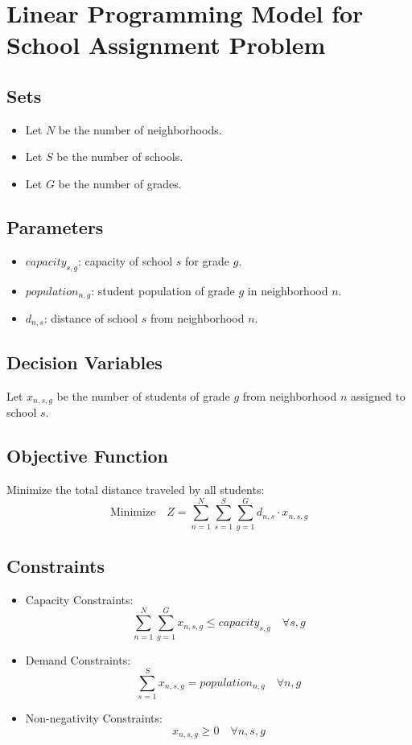 \documentclass{article}
\begin{document}
\section*{Linear Programming Model for School Assignment Problem}

\subsection*{Sets}
\begin{itemize}
    \item Let \( N \) be the number of neighborhoods.
    \item Let \( S \) be the number of schools.
    \item Let \( G \) be the number of grades.
\end{itemize}

\subsection*{Parameters}
\begin{itemize}
    \item \( capacity_{s,g} \): capacity of school \( s \) for grade \( g \).
    \item \( population_{n,g} \): student population of grade \( g \) in neighborhood \( n \).
    \item \( d_{n,s} \): distance of school \( s \) from neighborhood \( n \).
\end{itemize}

\subsection*{Decision Variables}
Let \( x_{n,s,g} \) be the number of students of grade \( g \) from neighborhood \( n \) assigned to school \( s \).

\subsection*{Objective Function}
Minimize the total distance traveled by all students:
\[
\text{Minimize} \quad Z = \sum_{n=1}^{N} \sum_{s=1}^{S} \sum_{g=1}^{G} d_{n,s} \cdot x_{n,s,g}
\]

\subsection*{Constraints}
\begin{itemize}
    \item Capacity Constraints:
    \[
    \sum_{n=1}^{N} \sum_{g=1}^{G} x_{n,s,g} \leq capacity_{s,g} \quad \forall s, g
    \]
    
    \item Demand Constraints:
    \[
    \sum_{s=1}^{S} x_{n,s,g} = population_{n,g} \quad \forall n, g
    \]
    
    \item Non-negativity Constraints:
    \[
    x_{n,s,g} \geq 0 \quad \forall n, s, g
    \]
\end{itemize}
\end{document}
